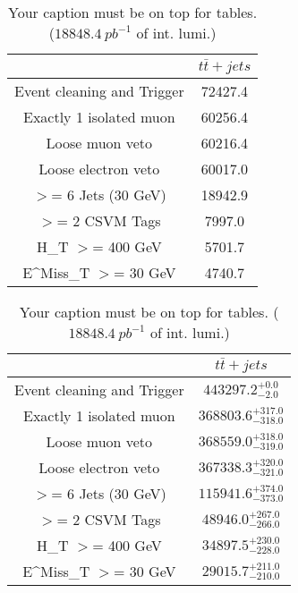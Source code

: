 \documentclass{article}
\begin{document}
\begin{table}
\caption{Your caption must be on top for tables. ($18848.4~pb^{-1}$ of int. lumi.)}
\label{tab:}
\centering
\begin{tabular}{|c|c|}
\toprule
&$t\bar{t}+jets$	\\

\midrule
Event cleaning and Trigger&	72427.4	\\

Exactly 1 isolated muon&	60256.4	\\

Loose muon veto&	60216.4	\\

Loose electron veto&	60017.0	\\

$>$= 6 Jets (30 GeV)&	18942.9	\\

$>$= 2 CSVM Tags&	7997.0	\\

H_{T} $>$=  400 GeV&	5701.7	\\

E^{Miss}_{T} $>$=  30 GeV&	4740.7	\\

\bottomrule
\end{tabular}
\end{table}
\begin{table}
\caption{Your caption must be on top for tables. ($18848.4~pb^{-1}$ of int. lumi.)}
\label{tab:}
\centering
\begin{tabular}{|c|c|}
\toprule
&$t\bar{t}+jets$	\\

\midrule
Event cleaning and Trigger&	$443297.2^{+0.0}_{-2.0}$	\\

Exactly 1 isolated muon&	$368803.6^{+317.0}_{-318.0}$	\\

Loose muon veto&	$368559.0^{+318.0}_{-319.0}$	\\

Loose electron veto&	$367338.3^{+320.0}_{-321.0}$	\\

$>$= 6 Jets (30 GeV)&	$115941.6^{+374.0}_{-373.0}$	\\

$>$= 2 CSVM Tags&	$48946.0^{+267.0}_{-266.0}$	\\

H_{T} $>$=  400 GeV&	$34897.5^{+230.0}_{-228.0}$	\\

E^{Miss}_{T} $>$=  30 GeV&	$29015.7^{+211.0}_{-210.0}$	\\

\bottomrule
\end{tabular}
\end{table}
\end{document}
